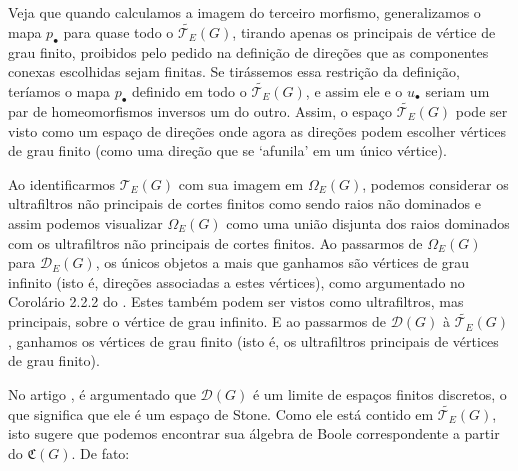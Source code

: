 \documentclass[11pt]{article}
\theoremstyle{definition}
\theoremstyle{definition}
\theoremstyle{definition}
\theoremstyle{definition}
\theoremstyle{definition}
\theoremstyle{definition}
\theoremstyle{definition}
\theoremstyle{definition}
\theoremstyle{definition}
\theoremstyle{definition}
\theoremstyle{definition}
\theoremstyle{definition}
\begin{document}
Veja que quando calculamos a imagem do terceiro morfismo, generalizamos o mapa $p_\bullet$  para quase todo o $\widetilde{\mathcal{T}_E}(G)$, tirando apenas os principais de vértice de grau finito, proibidos pelo pedido na definição de direções que as componentes conexas escolhidas sejam finitas. Se tirássemos essa restrição da definição, teríamos o mapa $p_\bullet$ definido em todo o $\widetilde{\mathcal{T}_E}(G)$, e assim ele e o $u_\bullet$ seriam um par de homeomorfismos inversos um do outro. Assim, o espaço $\widetilde{\mathcal{T}_E}(G)$ pode ser visto como um espaço de direções onde agora as direções podem escolher vértices de grau finito (como uma direção que se `afunila' em um único vértice).

Ao identificarmos $\mathcal{T}_E(G)$ com sua imagem em $\Omega_E(G)$, podemos considerar os ultrafiltros não principais de cortes finitos como sendo raios não dominados e assim podemos visualizar $\Omega_E(G)$ como uma união disjunta dos raios dominados com os ultrafiltros não principais de cortes finitos. Ao passarmos de $\Omega_E(G)$ para $\mathcal{D}_E(G)$, os únicos objetos a mais que ganhamos são vértices de grau infinito (isto é, direções associadas a estes vértices), como argumentado no Corolário 2.2.2 do \cite{meninos2025}. Estes também podem ser vistos como ultrafiltros, mas principais, sobre o vértice de grau infinito. E ao passarmos de $\mathcal{D}(G)$ à $\widetilde{\mathcal{T}_E}(G)$, ganhamos os vértices de grau finito (isto é, os ultrafiltros principais de vértices de grau finito).

No artigo \cite{meninos2025}, é argumentado que $\mathcal{D}(G)$ é um limite de espaços finitos discretos, o que significa que ele é um espaço de Stone. Como ele está contido em $\widetilde{\mathcal{T}_E}(G)$, isto sugere que podemos encontrar sua álgebra de Boole correspondente a partir do $\mathfrak{C}(G)$. De fato:
\end{document}
